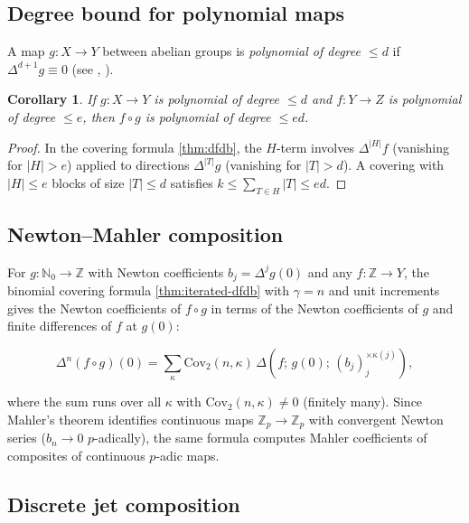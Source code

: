 \documentclass[10pt,a4paper]{article}
\theoremstyle{plain}
\newtheorem{corollary}[theorem]{Corollary}
\theoremstyle{definition}
\newcommand{\IN}{\mathbb{N}} %
\newcommand{\IZ}{\mathbb{Z}} %
\newcommand{\1}{\mathbb{1}} %
\newcommand{\Cov}{\mathrm{Cov}} %
\begin{document}
\subsection{Degree bound for polynomial
maps}\label{degree-bound-for-polynomial-maps}

A map \(g: X \to Y\) between abelian groups is \emph{polynomial of
degree \(\leq d\)} if \(\Delta^{d+1} g \equiv 0\) (see \citep{MO1934},
\citep{Leibman2002}).

\begin{corollary}

\label{cor:degree-bound} If \(g: X \to Y\) is polynomial of degree
\(\leq d\) and \(f: Y \to Z\) is polynomial of degree \(\leq e\), then
\(f \circ g\) is polynomial of degree \(\leq ed\).

\end{corollary}

\begin{proof}

In the covering formula \ref{thm:dfdb}, the \(H\)-term involves
\(\Delta^{|H|}f\) (vanishing for \(|H| > e\)) applied to directions
\(\Delta^{|T|}g\) (vanishing for \(|T| > d\)). A covering with
\(|H| \leq e\) blocks of size \(|T| \leq d\) satisfies
\(k \leq \sum_{T \in H} |T| \leq ed\).

\end{proof}

\subsection{Newton--Mahler composition}\label{newtonmahler-composition}

For \(g: \IN_0 \to \IZ\) with Newton coefficients
\(b_j = \Delta^j g(0)\) and any \(f: \IZ \to Y\), the binomial covering
formula \ref{thm:iterated-dfdb} with \(\gamma = n\) and unit increments
gives the Newton coefficients of \(f \circ g\) in terms of the Newton
coefficients of \(g\) and finite differences of \(f\) at \(g(0)\):

\[
  \Delta^n(f \circ g)(0) = \sum_{\kappa} \Cov_2(n, \kappa)\, \Delta(f;\, g(0);\, (b_j)_j^{\times \kappa(j)}),
\]

where the sum runs over all \(\kappa\) with \(\Cov_2(n, \kappa) \neq 0\)
(finitely many). Since Mahler's theorem identifies continuous maps
\(\IZ_p \to \IZ_p\) with convergent Newton series (\(b_n \to 0\)
\(p\)-adically), the same formula computes Mahler coefficients of
composites of continuous \(p\)-adic maps.

\subsection{Discrete jet composition}\label{discrete-jet-composition}
\end{document}
